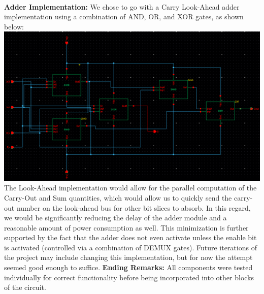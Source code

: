 \documentclass[12pt]{article}
\begin{document}
  \\
	\newline \newline
	\textbf{Adder Implementation:}
	\newline \newline
	We chose to go with a Carry Look-Ahead adder implementation using a combination of AND,
	OR, and XOR gates, as shown below:
	\newline \newline
  \includegraphics[scale=0.4]{add.png}
  \\
	\newline \newline
	The Look-Ahead implementation would allow for the parallel computation of the Carry-Out and
	Sum quantities, which would allow us to quickly send the carry-out number on the look-ahead
	bus for other bit slices to absorb. In this regard, we would be significantly reducing the delay
	of the adder module and a reasonable amount of power consumption as well. This minimization
	is further supported by the fact that the adder does not even activate unless the enable bit
	is activated (controlled via a combination of DEMUX gates). Future iterations of the project 
	may include changing this implementation, but for now the attempt seemed good enough to
	suffice.
	\newline \newline
	\textbf{Ending Remarks:}
	\newline \newline
	All components were tested individually for correct functionality before being incorporated 
	into other blocks of the circuit.
	\newline \newline
	
\end{document}
